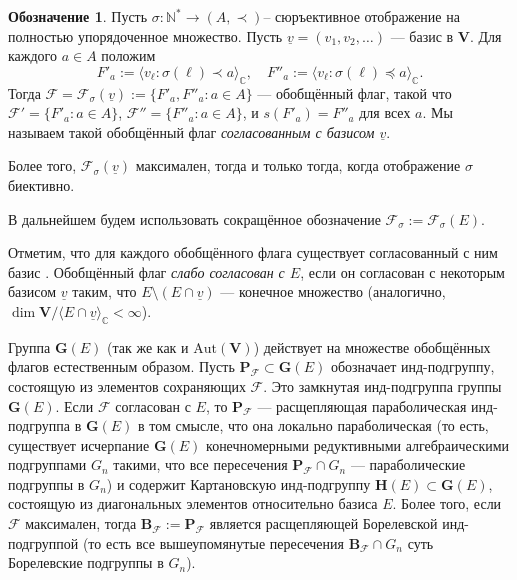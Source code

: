 \documentclass{amsart}
\theoremstyle{definition}
\newtheorem{notation}{Обозначение}
\newcommand{\NN}{\mathbb{N}^*}
\begin{document}
\begin{notation}
Пусть $\sigma:\NN\to (A,\prec)$-- сюръективное отображение на полностью упорядоченное множество.
Пусть $\underline{v}=(v_1,v_2,\ldots)$ --- базис в $\mathbf{V}$.
Для каждого $a\in A$ положим
\[F'_a:=\langle v_\ell:\sigma(\ell)\prec a\rangle_\mathbb{C},\quad
F''_a:=\langle v_\ell:\sigma(\ell)\preceq a\rangle_\mathbb{C}.\]
Тогда $\mathcal{F}=\mathcal{F}_\sigma(\underline{v}):=\{F'_a,F''_a:a\in A\}$ --- обобщённый флаг, такой что
$\mathcal{F}'=\{F'_a:a\in A\}$, $\mathcal{F}''=\{F''_a:a\in A\}$, и $s(F'_a)=F''_a$ для всех $a$.
Мы называем такой обобщённый флаг {\em согласованным с базисом $\underline{v}$}.

Более того, $\mathcal{F}_\sigma(\underline{v})$ максимален, тогда и только тогда, когда отображение $\sigma$ биективно.

В дальнейшем будем использовать сокращённое обозначение $\mathcal{F}_\sigma:=\mathcal{F}_\sigma(E)$.

Отметим, что для каждого обобщённого флага существует согласованный с ним базис \cite[предложение 4.1]{Dimitrov-Penkov}.
Обобщённый флаг {\em слабо согласован с $E$}, если он согласован с некоторым базисом  $\underline{v}$ таким, что $E\setminus(E\cap \underline{v})$ --- конечное множество (аналогично,  $\dim\mathbf{V}/\langle E\cap \underline{v}\rangle_\mathbb{C}<\infty$).
\end{notation}

Группа $\mathbf{G}(E)$ (так же как и $\mathrm{Aut}(\mathbf{V})$) действует на множестве обобщённых флагов естественным образом.
Пусть $\mathbf{P}_\mathcal{F}\subset\mathbf{G}(E)$ обозначает инд-подгруппу, состоящую из элементов сохраняющих  $\mathcal{F}$.
Это замкнутая инд-подгруппа группы $\mathbf{G}(E)$.
Если $\mathcal{F}$ согласован с  $E$, то $\mathbf{P}_\mathcal{F}$ --- расщепляющая параболическая инд-подгруппа в  $\mathbf{G}(E)$ в том смысле, что она локально параболическая (то есть, существует исчерпание $\mathbf{G}(E)$  конечномерными редуктивными алгебраическими подгруппами $G_n$ такими, что все пересечения $\mathbf{P}_\mathcal{F}\cap G_n$ ---  параболические подгруппы в $G_n$) и содержит Картановскую инд-подгруппу  $\mathbf{H}(E)\subset \mathbf{G}(E)$, состоящую из диагональных элементов относительно базиса  $E$.
Более того, если $\mathcal{F}$ максимален, тогда $\mathbf{B}_\mathcal{F}:=\mathbf{P}_\mathcal{F}$ является расщепляющей Борелевской инд-подгруппой
(то есть все вышеупомянутые пересечения $\mathbf{B}_\mathcal{F}\cap G_n$ суть Борелевские подгруппы в $G_n$).
\end{document}
